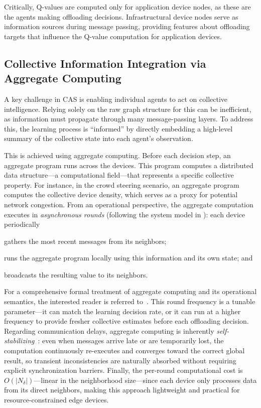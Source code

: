 Critically, 
 Q-values are computed only for application device nodes, 
 as these are the agents making offloading decisions.
%
Infrastructural device nodes serve as information sources during message passing, 
 providing features about offloading targets that influence the Q-value computation for application devices.


\subsection{Collective Information Integration via Aggregate Computing}\label{sec:aggregate-computing-integration}
A key challenge in \gls{CAS} is enabling individual agents to act on collective intelligence. 
%
Relying solely on the raw graph structure for this can be inefficient, 
 as information must propagate through many message-passing layers. 
%
To address this, the learning process is ``informed''
 by directly embedding a high-level summary of the collective state into each agent's observation.

This is achieved using aggregate computing. 
 Before each decision step, an aggregate program runs across the devices. 
 This program computes a distributed data structure---a computational field---that represents a specific collective property. 
 For instance, in the crowd steering scenario, 
 an aggregate program computes the collective device density, 
 which serves as a proxy for potential network congestion.
%
From an operational perspective, 
 the aggregate computation executes in \emph{asynchronous rounds} (following the system model in ):
 each device periodically
\begin{enumerate*}[label=(\roman*)]
  \item gathers the most recent messages from its neighbors;
  \item runs the aggregate program locally using this information and its own state; and
  \item broadcasts the resulting value to its neighbors.
\end{enumerate*}
For a comprehensive formal treatment of aggregate computing and its operational semantics, the interested reader is referred to~\cite{DBLP:journals/tocl/AudritoVDPB19}.
%
This round frequency is a tunable parameter---it can match the learning decision rate,
 or it can run at a higher frequency to provide fresher collective estimates before each offloading decision.
%
Regarding communication delays, aggregate computing is inherently \emph{self-stabilizing}~\cite{DBLP:journals/tocl/AudritoVDPB19}:
 even when messages arrive late or are temporarily lost,
 the computation continuously re-executes and converges toward the correct global result,
 so transient inconsistencies are naturally absorbed without requiring explicit synchronization barriers.
%
Finally, the per-round computational cost is $O(|N_\delta|)$---linear in the neighborhood size---since
 each device only processes data from its direct neighbors,
 making this approach lightweight and practical for resource-constrained edge devices.


